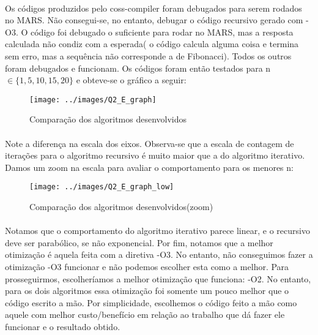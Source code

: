 \paragraph{} Os códigos produzidos pelo coss-compiler foram debugados para serem
rodados no MARS. Não consegui-se, no entanto, debugar o código recursivo gerado com -O3. O código
foi debugado o suficiente para rodar no MARS, mas a resposta calculada não condiz com a esperada(
o código calcula alguma coisa e termina sem erro, mas a sequência não corresponde a de Fibonacci). Todos
os outros foram debugados e funcionam. Os códigos foram então testados para n $\in \{1,5,10,15,20\}$ e obteve-se o gráfico
a seguir:
         \begin{figure}[H]
                 \centering
                 \texttt{[image: ../images/Q2\_E\_graph]}
                \caption{Comparação dos algoritmos desenvolvidos}
                 \label{fig:graph_1D_2}
         \end{figure}
\paragraph{} Note a diferença na escala dos eixos. Observa-se que a escala de contagem de iterações
para o algoritmo recursivo é muito maior que a do algoritmo iterativo. Damos um zoom na escala
para avaliar o comportamento para os menores n:

         \begin{figure}[H]
                 \centering
                 \texttt{[image: ../images/Q2\_E\_graph\_low]}
                \caption{Comparação dos algoritmos desenvolvidos(zoom)}
                 \label{fig:graph_1D_2}
         \end{figure}
         
        \paragraph{}Notamos que o comportamento do algoritmo iterativo parece linear,
        e o recursivo deve ser parabólico, se não exponencial. Por fim, notamos que 
        a melhor otimização é aquela feita com a diretiva -O3. No entanto, não conseguimos
        fazer a otimização -O3 funcionar e não podemos escolher esta como a melhor. Para
        prosseguirmos, escolheríamos a melhor otimização que funciona: -O2. No entanto, para
        os dois algoritmos essa otimização foi somente um pouco melhor que o código escrito a mão.
        Por simplicidade, escolhemos o código feito a mão como aquele com melhor custo/benefício
        em relação ao trabalho que dá fazer ele funcionar e o resultado obtido.
        
